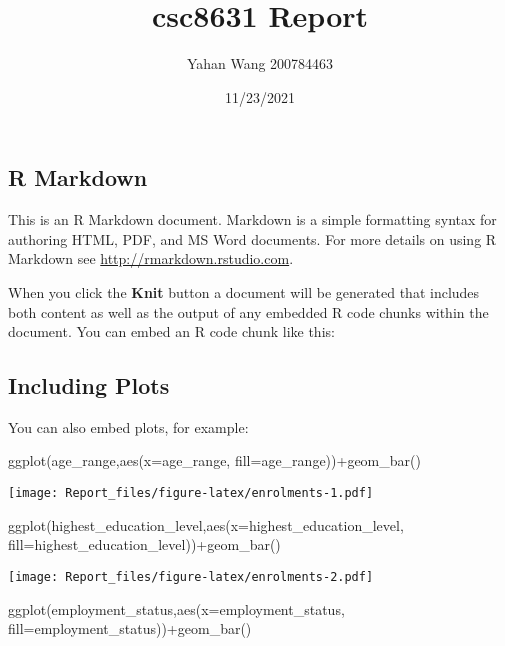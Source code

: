 \documentclass[
]{article}
\title{csc8631 Report}
\author{Yahan Wang 200784463}
\date{11/23/2021}
\newenvironment{Shaded}{\begin{snugshade}}{\end{snugshade}}
\newcommand{\AttributeTok}[1]{\textcolor[rgb]{0.77,0.63,0.00}{#1}}
\newcommand{\FunctionTok}[1]{\textcolor[rgb]{0.00,0.00,0.00}{#1}}
\newcommand{\NormalTok}[1]{#1}
\newcommand{\SpecialCharTok}[1]{\textcolor[rgb]{0.00,0.00,0.00}{#1}}
\begin{document}
\maketitle

\hypertarget{r-markdown}{%
\subsection{R Markdown}\label{r-markdown}}

This is an R Markdown document. Markdown is a simple formatting syntax
for authoring HTML, PDF, and MS Word documents. For more details on
using R Markdown see \url{http://rmarkdown.rstudio.com}.

When you click the \textbf{Knit} button a document will be generated
that includes both content as well as the output of any embedded R code
chunks within the document. You can embed an R code chunk like this:

\hypertarget{including-plots}{%
\subsection{Including Plots}\label{including-plots}}

You can also embed plots, for example:

\begin{Shaded}
\begin{Highlighting}[]
\FunctionTok{ggplot}\NormalTok{(age\_range,}\FunctionTok{aes}\NormalTok{(}\AttributeTok{x=}\NormalTok{age\_range, }\AttributeTok{fill=}\NormalTok{age\_range))}\SpecialCharTok{+}\FunctionTok{geom\_bar}\NormalTok{() }
\end{Highlighting}
\end{Shaded}

\texttt{[image: Report\_files/figure-latex/enrolments-1.pdf]}

\begin{Shaded}
\begin{Highlighting}[]
\FunctionTok{ggplot}\NormalTok{(highest\_education\_level,}\FunctionTok{aes}\NormalTok{(}\AttributeTok{x=}\NormalTok{highest\_education\_level, }\AttributeTok{fill=}\NormalTok{highest\_education\_level))}\SpecialCharTok{+}\FunctionTok{geom\_bar}\NormalTok{()  }
\end{Highlighting}
\end{Shaded}

\texttt{[image: Report\_files/figure-latex/enrolments-2.pdf]}

\begin{Shaded}
\begin{Highlighting}[]
\FunctionTok{ggplot}\NormalTok{(employment\_status,}\FunctionTok{aes}\NormalTok{(}\AttributeTok{x=}\NormalTok{employment\_status, }\AttributeTok{fill=}\NormalTok{employment\_status))}\SpecialCharTok{+}\FunctionTok{geom\_bar}\NormalTok{()  }
\end{Highlighting}
\end{Shaded}
\end{document}
